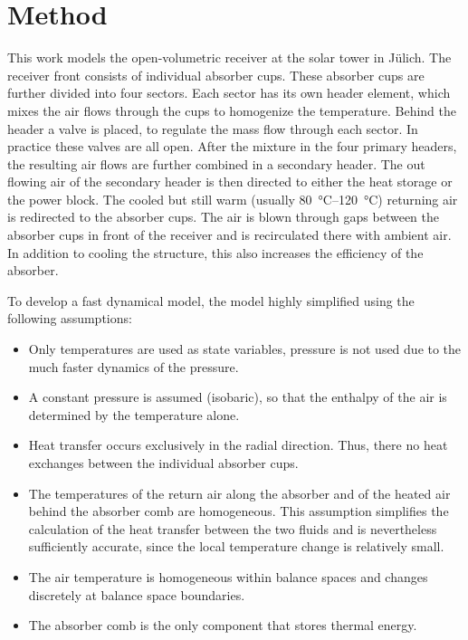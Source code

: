 \chapter{Method}

This work models the open-volumetric receiver at the solar tower in Jülich.
The receiver front consists of individual absorber cups.
These absorber cups are further divided into four sectors.
Each sector has its own header element, which mixes the air flows through the cups to homogenize the temperature.
Behind the header a valve is placed, to regulate the mass flow through each sector.
In practice these valves are all open.
After the mixture in the four primary headers, the resulting air flows are further combined in a secondary header.
The out flowing air of the secondary header is then directed to either the heat storage or the power block.
The cooled but still warm (usually \SIrange{80}{120}{\degreeCelsius}) returning air is redirected to the absorber cups.
The air is blown through gaps between the absorber cups in front of the receiver and is recirculated there with ambient air.
In addition to cooling the structure, this also increases the efficiency of the absorber.


To develop a fast dynamical model, the model highly simplified using the following assumptions:

\begin{itemize}
    \item Only temperatures are used as state variables, pressure is not used due to the much faster dynamics of the pressure.
    \item A constant pressure is assumed (isobaric), so that the enthalpy of the air is determined by the temperature alone.
    \item Heat transfer occurs exclusively in the radial direction. Thus, there no heat exchanges between the individual absorber cups.
    \item The temperatures of the return air along the absorber and of the heated air behind the absorber comb are homogeneous. This assumption simplifies the calculation of the heat transfer between the two fluids and is nevertheless sufficiently accurate, since the local temperature change is relatively small.
    \item The air temperature is homogeneous within balance spaces and changes discretely at balance space boundaries.
    \item The absorber comb is the only component that stores thermal energy.
\end{itemize}

